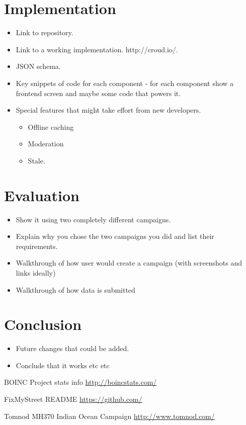 \documentclass{article}
\let\oldsection\section
\renewcommand\section{\clearpage\oldsection}
\begin{document}
	\section{Implementation}
		\begin{itemize}
			\item Link to repository.
			\item Link to a working implementation. http://croud.io/.
			\item JSON schema.
			\item Key snippets of code for each component - for each component show a frontend screen and maybe some code that powers it.
			\item Special features that might take effort from new developers.
			\begin{itemize}
				\item Offline caching
				\item Moderation
				\item Stale.
			\end{itemize}
		\end{itemize}

	\section{Evaluation}
		\begin{itemize}
			\item Show it using two completely different campaigns.
			\item Explain why you chose the two campaigns you did and list their requirements.
			\item Walkthrough of how user would create a campaign (with screenshots and links ideally)
			\item Walkthrough of how data is submitted
		\end{itemize}
	\section{Conclusion}
		\begin{itemize}
			\item Future changes that could be added.
			\item Conclude that it works etc etc
		\end{itemize}

	\begin{thebibliography}{9}
		BOINC Project stats info
		\href{http://boincstats.com/en/stats/projectStatsInfo}{http://boincstats.com/}

		FixMyStreet README
		\href{https://github.com/mysociety/fixmystreet/blob/afe94a2eff801b769e55d5527a1367406810958a/README.md}{https://github.com/}

		Tomnod MH370 Indian Ocean Campaign
		\href{http://www.tomnod.com/campaign/mh370_indian_ocean}{http://www.tomnod.com/}

	\end{thebibliography}
\end{document}
